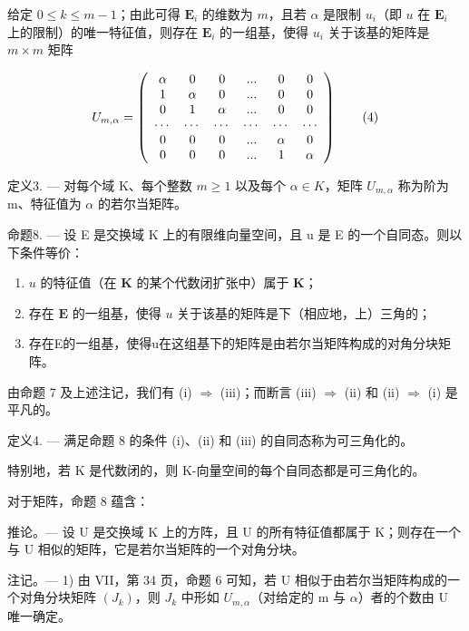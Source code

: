 给定 \(0 \leqslant k \leqslant m - 1\)；由此可得 \(\mathbf{E}_i\) 的维数为 \(m\)，且若 \(\alpha\) 是限制 \(u_i\)（即 \(u\) 在 \(\mathbf{E}_i\) 上的限制）的唯一特征值，则存在 \(\mathbf{E}_i\) 的一组基，使得 \(u_i\) 关于该基的矩阵是 \(m \times m\) 矩阵

\[
U _ {m, \alpha} = \left( \begin{array}{c c c c c c} \alpha & 0 & 0 & ... & 0 & 0 \\ 1 & \alpha & 0 & ... & 0 & 0 \\ 0 & 1 & \alpha & ... & 0 & 0 \\ \cdots & \cdots & \cdots & \cdots & \cdots & \cdots \\ 0 & 0 & 0 & ... & \alpha & 0 \\ 0 & 0 & 0 & ... & 1 & \alpha \end{array} \right)\tag{4}
\]

定义3. --- 对每个域 K、每个整数 \(m \geqslant 1\) 以及每个 \(\alpha \in K\)，矩阵 \(U_{m,\alpha}\) 称为阶为 m、特征值为 \(\alpha\) 的若尔当矩阵。

命题8. --- 设 E 是交换域 K 上的有限维向量空间，且 u 是 E 的一个自同态。则以下条件等价：

\begin{enumerate}
\def\labelenumi{(\roman{enumi})}
\item
  \(u\) 的特征值（在 \(\mathbf{K}\) 的某个代数闭扩张中）属于 \(\mathbf{K}\)；
\item
  存在 \(\mathbf{E}\) 的一组基，使得 \(u\) 关于该基的矩阵是下（相应地，上）三角的；
\item
  存在E的一组基，使得u在这组基下的矩阵是由若尔当矩阵构成的对角分块矩阵。
\end{enumerate}

由命题 7 及上述注记，我们有 (i) \(\Rightarrow\) (iii)；而断言 (iii) \(\Rightarrow\) (ii) 和 (ii) \(\Rightarrow\) (i) 是平凡的。

定义4. --- 满足命题 8 的条件 (i)、(ii) 和 (iii) 的自同态称为可三角化的。

特别地，若 K 是代数闭的，则 K-向量空间的每个自同态都是可三角化的。

对于矩阵，命题 8 蕴含：

推论。--- 设 U 是交换域 K 上的方阵，且 U 的所有特征值都属于 K；则存在一个与 U 相似的矩阵，它是若尔当矩阵的一个对角分块。

注记。--- 1) 由 VII，第 34 页，命题 6 可知，若 U 相似于由若尔当矩阵构成的一个对角分块矩阵 \((J_{k})\)，则 \(J_{k}\) 中形如 \(U_{m,\alpha}\)（对给定的 m 与 \(\alpha\)）者的个数由 U 唯一确定。

